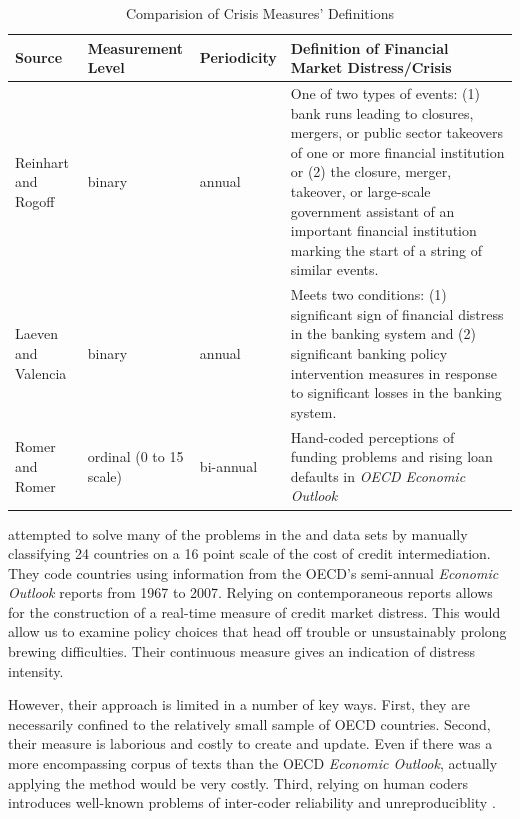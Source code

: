 \documentclass[]{article}
\begin{document}
\begin{table}
    \caption{Comparision of Crisis Measures' Definitions}
    \label{comp_table}
    \begin{center}
        \begin{tabular}{m{3cm} | m{2cm} m{2cm} m{7cm}}
            Source & Measurement Level & Periodicity &  Definition of Financial Market Distress/Crisis \\
            \hline\hline
                Reinhart and Rogoff \citeyearpar[11]{Reinhart2009,ReinhartRog2010} & binary & annual & One of two types of events: (1) bank runs leading to closures, mergers, or public sector takeovers of one or more financial institution or (2) the closure, merger, takeover, or large-scale government assistant of an important financial institution marking the start of a string of similar events.  \\
                Laeven and Valencia \citeyearpar[228]{laeven2013} & binary & annual & Meets two conditions: (1) significant sign of financial distress in the banking system and (2) significant banking policy intervention measures in response to significant losses in the banking system.  \\
                Romer and Romer \citeyearpar[3]{Romer2015} & ordinal (0 to 15 scale) & bi-annual & Hand-coded perceptions of funding problems and rising loan defaults in \emph{OECD Economic Outlook}  \\
            \hline
        \end{tabular}
    \end{center}
\end{table}

\cite{Romer2015} attempted to solve many of the problems in the \cite{Reinhart2009} and \cite{laeven2013} data sets by manually
classifying 24 countries on a 16 point scale of the cost of
credit intermediation. They code countries using information from the OECD's semi-annual \emph{Economic Outlook} reports from 1967 to 2007. Relying on contemporaneous reports allows for the construction of a real-time measure of credit market distress. This would allow us to examine policy choices that head off trouble or unsustainably prolong brewing difficulties. Their  continuous measure gives an indication of distress intensity.

However, their approach is limited in a number of key ways. First, they are necessarily confined to the relatively small sample of OECD countries. Second, their measure is laborious and costly to create and update. Even if there was a more encompassing corpus of texts than the OECD \emph{Economic Outlook}, actually applying the method would be very costly. Third, relying on human coders introduces well-known problems of inter-coder reliability and unreproduciblity \citep{Minhas2015}.
\end{document}
